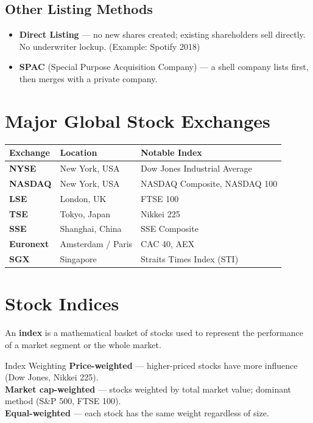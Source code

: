 \subsection{Other Listing Methods}
\begin{itemize}
  \item \textbf{Direct Listing} — no new shares created; existing shareholders sell directly. No underwriter lockup. (Example: Spotify 2018)
  \item \textbf{SPAC} (Special Purpose Acquisition Company) — a shell company lists first, then merges with a private company.
\end{itemize}

\section{Major Global Stock Exchanges}

\begin{center}
\begin{tabular}{>{\bfseries}p{3cm} p{3.5cm} p{6cm}}
\toprule
Exchange & Location & Notable Index \\
\midrule
NYSE & New York, USA & Dow Jones Industrial Average \\
NASDAQ & New York, USA & NASDAQ Composite, NASDAQ 100 \\
LSE & London, UK & FTSE 100 \\
TSE & Tokyo, Japan & Nikkei 225 \\
SSE & Shanghai, China & SSE Composite \\
Euronext & Amsterdam / Paris & CAC 40, AEX \\
SGX & Singapore & Straits Times Index (STI) \\
\bottomrule
\end{tabular}
\end{center}

\section{Stock Indices}

An \textbf{index} is a mathematical basket of stocks used to represent the performance
of a market segment or the whole market.

\begin{keyterm}{Index Weighting}
\textbf{Price-weighted} — higher-priced stocks have more influence (Dow Jones, Nikkei 225).\\
\textbf{Market cap-weighted} — stocks weighted by total market value; dominant method (S\&P 500, FTSE 100).\\
\textbf{Equal-weighted} — each stock has the same weight regardless of size.
\end{keyterm}

